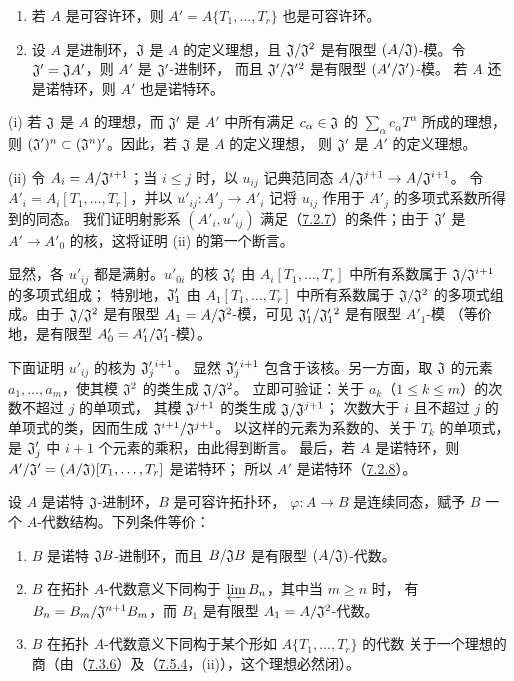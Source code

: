 \begin{enumerate}[label=(\roman*)]
\item 若 $A$ 是可容许环，则 $A'=A\{T_1,\ldots,T_r\}$ 也是可容许环。
\item 设 $A$ 是进制环，$\mathfrak J$ 是 $A$ 的定义理想，且 $\mathfrak J/\mathfrak J^2$ 是有限型
$(A/\mathfrak J)$-模。令 $\mathfrak J'=\mathfrak J A'$，则 $A'$ 是 $\mathfrak J'$-进制环，
而且 $\mathfrak J'/\mathfrak J'{}^2$ 是有限型 $(A'/\mathfrak J')$-模。
若 $A$ 还是诺特环，则 $A'$ 也是诺特环。
\end{enumerate}

(i) 若 $\mathfrak J$ 是 $A$ 的理想，而 $\mathfrak J'$ 是 $A'$ 中所有满足
$c_\alpha\in\mathfrak J$ 的 $\sum_\alpha c_\alpha T^\alpha$ 所成的理想，
则 $(\mathfrak J')^n\subset(\mathfrak J^n)'$。因此，若 $\mathfrak J$ 是 $A$ 的定义理想，
则 $\mathfrak J'$ 是 $A'$ 的定义理想。

(ii) 令 $A_i=A/\mathfrak J^{i+1}$；当 $i\leq j$ 时，以 $u_{ij}$ 记典范同态
$A/\mathfrak J^{j+1}\to A/\mathfrak J^{i+1}$。
令 $A'_i=A_i[T_1,\ldots,T_r]$，并以 $u'_{ij}:A'_j\to A'_i$ 记将
$u_{ij}$ 作用于 $A'_j$ 的多项式系数所得到的同态。
我们证明射影系 $(A'_i,u'_{ij})$ 满足（\hyperlink{para:0:7.2.7}{7.2.7}）的条件；由于 $\mathfrak J'$ 是
$A'\to A'_0$ 的核，这将证明 (ii) 的第一个断言。

显然，各 $u'_{ij}$ 都是满射。$u'_{0i}$ 的核 $\mathfrak J'_i$ 由
$A_i[T_1,\ldots,T_r]$ 中所有系数属于 $\mathfrak J/\mathfrak J^{i+1}$ 的多项式组成；
特别地，$\mathfrak J'_1$ 由 $A_1[T_1,\ldots,T_r]$ 中所有系数属于
$\mathfrak J/\mathfrak J^2$ 的多项式组成。由于 $\mathfrak J/\mathfrak J^2$ 是有限型
$A_1=A/\mathfrak J^2$-模，可见 $\mathfrak J'_1/\mathfrak J_1'{}^2$ 是有限型 $A'_1$-模
（等价地，是有限型 $A'_0=A'_1/\mathfrak J'_1$-模）。

下面证明 $u'_{ij}$ 的核为 $\mathfrak J_j'{}^{i+1}$。
显然 $\mathfrak J_j'{}^{i+1}$ 包含于该核。另一方面，取 $\mathfrak J$ 的元素
$a_1,\ldots,a_m$，使其模 $\mathfrak J^2$ 的类生成 $\mathfrak J/\mathfrak J^2$。
立即可验证：关于 $a_k$（$1\leq k\leq m$）的次数不超过 $j$ 的单项式，
其模 $\mathfrak J^{j+1}$ 的类生成 $\mathfrak J/\mathfrak J^{j+1}$；
次数大于 $i$ 且不超过 $j$ 的单项式的类，因而生成
$\mathfrak J^{i+1}/\mathfrak J^{j+1}$。
以这样的元素为系数的、关于 $T_k$ 的单项式，是
$\mathfrak J'_j$ 中 $i+1$ 个元素的乘积，由此得到断言。
最后，若 $A$ 是诺特环，则
$A'/\mathfrak J'=(A/\mathfrak J)[T_1,\ldots,T_r]$ 是诺特环；
所以 $A'$ 是诺特环（\hyperlink{para:0:7.2.8}{7.2.8}）。

设 $A$ 是诺特 $\mathfrak J$-进制环，$B$ 是可容许拓扑环，
$\varphi:A\to B$ 是连续同态，赋予 $B$ 一个 $A$-代数结构。下列条件等价：
\begin{enumerate}[label=\alph*)]
\item $B$ 是诺特 $\mathfrak J B$-进制环，而且 $B/\mathfrak J B$ 是有限型 $(A/\mathfrak J)$-代数。
\item $B$ 在拓扑 $A$-代数意义下同构于 $\varprojlim B_n$，其中当 $m\geq n$ 时，
有 $B_n=B_m/\mathfrak J^{n+1}B_m$，而 $B_1$ 是有限型 $A_1=A/\mathfrak J^2$-代数。
\item $B$ 在拓扑 $A$-代数意义下同构于某个形如 $A\{T_1,\ldots,T_r\}$ 的代数
关于一个理想的商（由（\hyperlink{para:0:7.3.6}{7.3.6}）及（\hyperlink{para:0:7.5.4}{7.5.4}，(ii)），这个理想必然闭）。
\end{enumerate}

